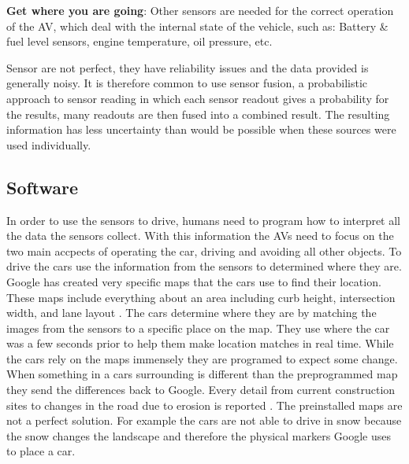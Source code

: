 \documentclass[11pt]{article}
\begin{document}
\textbf{Get where you are going}:
Other sensors are needed for the correct operation of the AV, which deal with the internal state of the vehicle, such as: Battery \& fuel level sensors, engine temperature, oil pressure, etc.

Sensor are not perfect, they have reliability issues and the data provided is generally noisy. It is therefore common to use sensor fusion, a probabilistic approach to sensor reading in which each sensor readout gives a probability for the results, many readouts are then fused into a combined result. The resulting information has less uncertainty than would be possible when these sources were used individually.\cite{HellstromUmea}

\subsection{Software}
In order to use the sensors to drive, humans need to program how to interpret all the data the sensors collect. With this information the AVs need to focus on the two main accpects of operating the car, driving and avoiding all other objects. To drive the cars use the information from the sensors to determined where they are. Google has created very specific maps that the cars use to find their location. These maps include everything about an area including curb height, intersection width, and lane layout \cite{chrisurmson2016}.
The cars determine where they are by matching the images from the sensors to
a specific place on the map. They use where the car was a few seconds prior to help them make location matches in real
time. While the cars rely on the maps immensely they are programed to expect some change. When something in a cars surrounding is
different than the preprogrammed map they send the differences back to Google. Every detail from current construction sites to changes in the road due to erosion
is reported \cite{chrisurmson2016}. The preinstalled maps are not a perfect solution. For example the
cars are not able to drive in snow because the snow changes the landscape and therefore the physical markers Google
uses to place a car\cite{chrisurmson2016}. 
\end{document}
